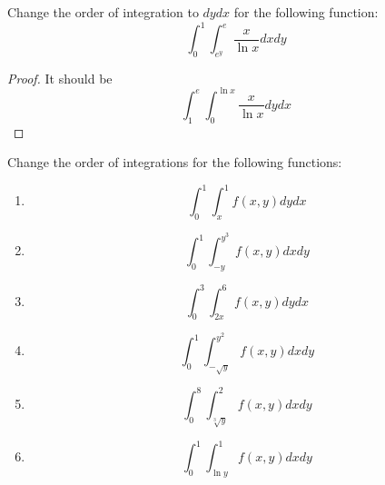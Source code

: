 \documentclass[openany]{book}
\begin{document}
\newpage
\begin{prob}
    Change the order of integration to $dydx$ for the following function:
    \begin{equation*}
        \int_0^1\int_{e^y}^{e}\frac{x}{\ln x}dxdy
    \end{equation*}
\end{prob}
\begin{proof}
    It should be 
    \begin{equation*}
        \int_1^e\int_{0}^{\ln x}\frac{x}{\ln x}dydx
    \end{equation*}
\end{proof}


\begin{prob}
    Change the order of integrations for the following functions:
    \begin{enumerate}
        \item \begin{equation*}
            \int_0^1\int_x^1f(x,y)dydx
        \end{equation*}
        \item \begin{equation*}
            \int_0^1\int_{-y}^{y^3}f(x,y)dxdy
        \end{equation*}
        \item \begin{equation*}
            \int_0^3\int_{2x}^6f(x,y)dydx
        \end{equation*}
        \item \begin{equation*}
            \int_0^1\int_{-\sqrt{y}}^{y^2}f(x,y)dxdy
        \end{equation*}
        \item \begin{equation*}
            \int_0^8\int_{\sqrt[3]{y}}^2f(x,y)dxdy
        \end{equation*}
        \item \begin{equation*}
            \int_0^1\int_{\ln y}^1f(x,y)dxdy
        \end{equation*}
    \end{enumerate}
\end{prob}
\end{document}
